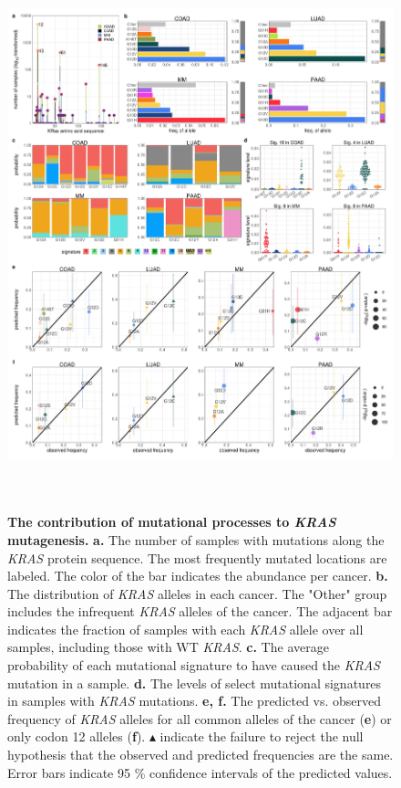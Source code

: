 \documentclass[english, 10pt, letterpaper]{article}
\newcommand{\KRAS}{\emph{KRAS}}
\begin{document}
\begin{figure}[p]
\centering
\includegraphics[height=160mm]{figures/Figure_01.jpeg}
\caption{
    \textbf{The contribution of mutational processes to \KRAS{} mutagenesis.}
    \textbf{a.} The number of samples with mutations along the \KRAS{} protein sequence. The most frequently mutated locations are labeled. The color of the bar indicates the abundance per cancer. 
    \textbf{b.} The distribution of \KRAS{} alleles in each cancer. The "Other" group includes the infrequent \KRAS{} alleles of the cancer. The adjacent bar indicates the fraction of samples with each \KRAS{} allele over all samples, including those with WT \KRAS{}.
    \textbf{c.} The average probability of each mutational signature to have caused the \KRAS{} mutation in a sample.
    \textbf{d.} The levels of select mutational signatures in samples with \KRAS{} mutations.
    \textbf{e, f.} The predicted vs. observed frequency of \KRAS{} alleles for all common alleles of the cancer (\textbf{e}) or only codon 12 alleles (\textbf{f}). $\blacktriangle$ indicate the failure to reject the null hypothesis that the observed and predicted frequencies are the same. Error bars indicate 95 \% confidence intervals of the predicted values.
}
\label{fig:mutational-signatures-main}
\end{figure}
\end{document}
